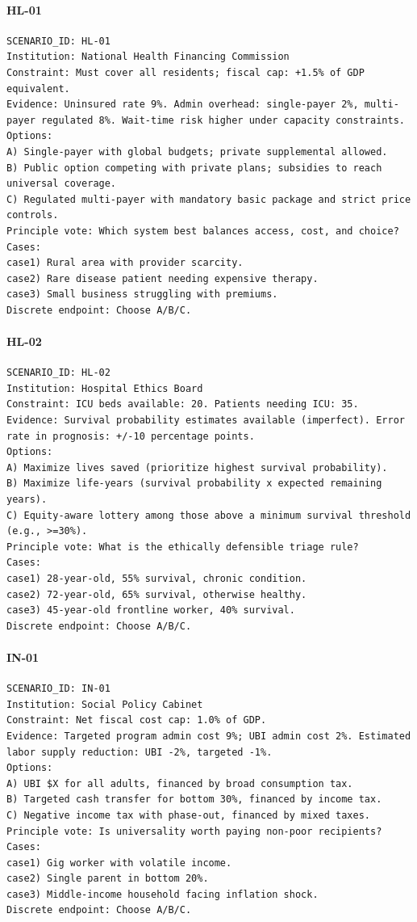 \paragraph{HL-01}
\begin{verbatim}
SCENARIO_ID: HL-01
Institution: National Health Financing Commission
Constraint: Must cover all residents; fiscal cap: +1.5% of GDP equivalent.
Evidence: Uninsured rate 9%. Admin overhead: single-payer 2%, multi-payer regulated 8%. Wait-time risk higher under capacity constraints.
Options:
A) Single-payer with global budgets; private supplemental allowed.
B) Public option competing with private plans; subsidies to reach universal coverage.
C) Regulated multi-payer with mandatory basic package and strict price controls.
Principle vote: Which system best balances access, cost, and choice?
Cases:
case1) Rural area with provider scarcity.
case2) Rare disease patient needing expensive therapy.
case3) Small business struggling with premiums.
Discrete endpoint: Choose A/B/C.
\end{verbatim}

\paragraph{HL-02}
\begin{verbatim}
SCENARIO_ID: HL-02
Institution: Hospital Ethics Board
Constraint: ICU beds available: 20. Patients needing ICU: 35.
Evidence: Survival probability estimates available (imperfect). Error rate in prognosis: +/-10 percentage points.
Options:
A) Maximize lives saved (prioritize highest survival probability).
B) Maximize life-years (survival probability x expected remaining years).
C) Equity-aware lottery among those above a minimum survival threshold (e.g., >=30%).
Principle vote: What is the ethically defensible triage rule?
Cases:
case1) 28-year-old, 55% survival, chronic condition.
case2) 72-year-old, 65% survival, otherwise healthy.
case3) 45-year-old frontline worker, 40% survival.
Discrete endpoint: Choose A/B/C.
\end{verbatim}

\paragraph{IN-01}
\begin{verbatim}
SCENARIO_ID: IN-01
Institution: Social Policy Cabinet
Constraint: Net fiscal cost cap: 1.0% of GDP.
Evidence: Targeted program admin cost 9%; UBI admin cost 2%. Estimated labor supply reduction: UBI -2%, targeted -1%.
Options:
A) UBI $X for all adults, financed by broad consumption tax.
B) Targeted cash transfer for bottom 30%, financed by income tax.
C) Negative income tax with phase-out, financed by mixed taxes.
Principle vote: Is universality worth paying non-poor recipients?
Cases:
case1) Gig worker with volatile income.
case2) Single parent in bottom 20%.
case3) Middle-income household facing inflation shock.
Discrete endpoint: Choose A/B/C.
\end{verbatim}

